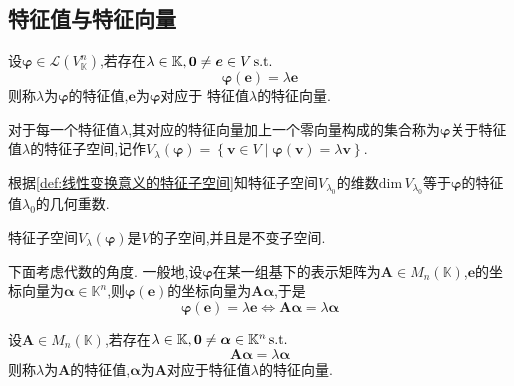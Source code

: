 \subsection{特征值与特征向量}
\begin{formal}
    \begin{definition}[线性变换意义的特征值与特征向量]\label{def:线性变换意义的特征值与特征向量}
        设$\bm{\varphi}\in\mathcal{L}\left(
            V_{\mathbb{K}}^n
        \right)$,若存在$\lambda\in\mathbb{K},\bm{0}\neq \bm{e}\in V\,\textup{s.t.}$
        \[
        \bm{\varphi}\left(\bm{e}\right)=\lambda\bm{e}
        \]则称$\lambda$为$\bm{\varphi}$的特征值,$\bm{e}$为$\bm{\varphi}$对应于
        特征值$\lambda$的特征向量.
    \end{definition}
\end{formal}
\begin{formal}
\begin{definition}[线性变换意义的特征子空间]\label{def:线性变换意义的特征子空间}
    对于每一个特征值$\lambda$,其对应的特征向量加上一个零向量构成的集合称为$\bm{\varphi}$关于特征值$\lambda$的特征子空间,记作$V_{\lambda}\left(\bm{\varphi}\right)=
        \left\{
            \bm{v}\in V\mid \bm{\varphi}\left(\bm{v}\right)=\lambda\bm{v}
        \right\}$.
\end{definition}
\end{formal}
\begin{formal}
\begin{theorem}[特征子空间的维数]\label{thm:特征子空间的维数}
    根据\cref{def:线性变换意义的特征子空间}知特征子空间$V_{\lambda_0}$的维数$\mathrm{dim}\,V_{\lambda_0}$等于$\bm{\varphi}$的特征值$\lambda_0$的几何重数.
\end{theorem}
\end{formal}
\begin{green}
\begin{lemma}[特征子空间]\label{lem:特征子空间}
    特征子空间$V_{\lambda}\left(\bm{\varphi}\right)$是$V$的子空间,并且是不变子空间.
\end{lemma}
\end{green}
下面考虑代数的角度.
一般地,设$\bm{\varphi}$在某一组基下的表示矩阵为$\bm{A}\in M_n\left(
    \mathbb{K}
\right)$,$\bm{e}$的坐标向量为$\bm{\alpha}\in\mathbb{K}^n$,则$\bm{\varphi}\left(
    \bm{e}
\right)$的坐标向量为$\bm{A\alpha}$,于是
\[
\bm{\varphi}\left(\bm{e}\right)=\lambda\bm{e}\Longleftrightarrow
\bm{A\alpha}=\lambda\bm{\alpha}
\]
\begin{formal}
\begin{definition}[矩阵意义的特征值与特征向量]\label{def:矩阵意义的特征值与特征向量}
    设$\bm{A}\in M_n\left(
        \mathbb{K}
    \right)$,若存在$\lambda\in\mathbb{K},\bm{0}\neq\bm{\alpha}\in\mathbb{K}^n\,\textup{s.t.}$
    \[
    \bm{A\alpha}=\lambda\bm{\alpha}
    \]则称$\lambda$为$\bm{A}$的特征值,$\bm{\alpha}$为$\bm{A}$对应于特征值$\lambda$的特征向量.
\end{definition}
\end{formal}
